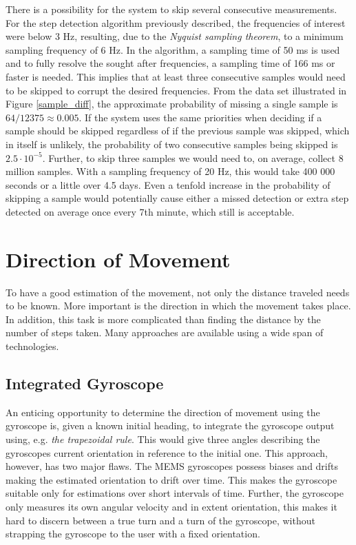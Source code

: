 \documentclass{LTHthesis}
\begin{document}
There is a possibility for the system to skip several consecutive measurements. For the step detection algorithm previously described, the frequencies of interest were below 3 Hz, resulting, due to the \emph{Nyquist sampling theorem}, to a minimum sampling frequency of 6 Hz. In the algorithm, a sampling time of  50 ms is used and to fully resolve the sought after frequencies, a sampling time of 166 ms or faster is needed. This implies that at least three consecutive samples would need to be skipped to corrupt the desired frequencies. From the data set illustrated in Figure \ref{sample_diff}, the approximate probability of missing a single sample is $64/12375\approx0.005$. If the system uses the same priorities when deciding if a sample should be skipped regardless of if the previous sample was skipped, which in itself is unlikely, the probability of two consecutive samples being skipped is $2.5\cdot10^{-5}$. Further, to skip three samples we would need to, on average, collect 8 million samples. With a sampling frequency of 20 Hz, this would take 400 000 seconds or a little over 4.5 days. Even a tenfold increase in the probability of skipping a sample would potentially cause either a missed detection or extra step detected on average once every 7th minute, which still is acceptable.              
%

\section{Direction of Movement}
%
To have a good estimation of the movement, not only the distance traveled needs to be known. More important is the direction in which the movement takes place. In addition, this task is more complicated than finding the distance by the number of steps taken. Many approaches are available using a wide span of technologies. 
%
\subsection{Integrated Gyroscope}
%
An enticing opportunity to determine the direction of movement using the gyroscope is, given a known initial heading, to integrate the gyroscope output using, e.g. \emph{the trapezoidal rule}. This would give three angles describing the gyroscopes current orientation in reference to the initial one. This approach, however, has two major flaws. The MEMS gyroscopes possess biases and drifts making the estimated orientation to drift over time. This makes the gyroscope suitable only for estimations over short intervals of time. Further, the gyroscope only measures its own angular velocity and in extent orientation, this makes it hard to discern between a true turn and a turn of the gyroscope, without strapping the gyroscope to the user with a fixed orientation. 
\end{document}
